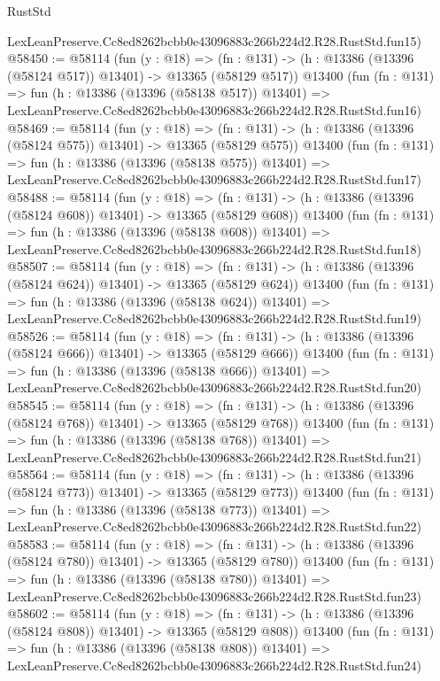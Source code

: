 \begin{lexlean}{RustStd}
\begin{coremodule}
    LexLeanPreserve.Cc8ed8262bcbb0e43096883c266b224d2.R28.RustStd.fun15)
@58450 := @58114
    (fun (y : @18) =>
    (fn : @131) -> (h : @13386 (@13396 (@58124 @517)) @13401) -> @13365 (@58129 @517))
    @13400
    (fun (fn : @131) =>
    fun (h : @13386 (@13396 (@58138 @517)) @13401) =>
    LexLeanPreserve.Cc8ed8262bcbb0e43096883c266b224d2.R28.RustStd.fun16)
@58469 := @58114
    (fun (y : @18) =>
    (fn : @131) -> (h : @13386 (@13396 (@58124 @575)) @13401) -> @13365 (@58129 @575))
    @13400
    (fun (fn : @131) =>
    fun (h : @13386 (@13396 (@58138 @575)) @13401) =>
    LexLeanPreserve.Cc8ed8262bcbb0e43096883c266b224d2.R28.RustStd.fun17)
@58488 := @58114
    (fun (y : @18) =>
    (fn : @131) -> (h : @13386 (@13396 (@58124 @608)) @13401) -> @13365 (@58129 @608))
    @13400
    (fun (fn : @131) =>
    fun (h : @13386 (@13396 (@58138 @608)) @13401) =>
    LexLeanPreserve.Cc8ed8262bcbb0e43096883c266b224d2.R28.RustStd.fun18)
@58507 := @58114
    (fun (y : @18) =>
    (fn : @131) -> (h : @13386 (@13396 (@58124 @624)) @13401) -> @13365 (@58129 @624))
    @13400
    (fun (fn : @131) =>
    fun (h : @13386 (@13396 (@58138 @624)) @13401) =>
    LexLeanPreserve.Cc8ed8262bcbb0e43096883c266b224d2.R28.RustStd.fun19)
@58526 := @58114
    (fun (y : @18) =>
    (fn : @131) -> (h : @13386 (@13396 (@58124 @666)) @13401) -> @13365 (@58129 @666))
    @13400
    (fun (fn : @131) =>
    fun (h : @13386 (@13396 (@58138 @666)) @13401) =>
    LexLeanPreserve.Cc8ed8262bcbb0e43096883c266b224d2.R28.RustStd.fun20)
@58545 := @58114
    (fun (y : @18) =>
    (fn : @131) -> (h : @13386 (@13396 (@58124 @768)) @13401) -> @13365 (@58129 @768))
    @13400
    (fun (fn : @131) =>
    fun (h : @13386 (@13396 (@58138 @768)) @13401) =>
    LexLeanPreserve.Cc8ed8262bcbb0e43096883c266b224d2.R28.RustStd.fun21)
@58564 := @58114
    (fun (y : @18) =>
    (fn : @131) -> (h : @13386 (@13396 (@58124 @773)) @13401) -> @13365 (@58129 @773))
    @13400
    (fun (fn : @131) =>
    fun (h : @13386 (@13396 (@58138 @773)) @13401) =>
    LexLeanPreserve.Cc8ed8262bcbb0e43096883c266b224d2.R28.RustStd.fun22)
@58583 := @58114
    (fun (y : @18) =>
    (fn : @131) -> (h : @13386 (@13396 (@58124 @780)) @13401) -> @13365 (@58129 @780))
    @13400
    (fun (fn : @131) =>
    fun (h : @13386 (@13396 (@58138 @780)) @13401) =>
    LexLeanPreserve.Cc8ed8262bcbb0e43096883c266b224d2.R28.RustStd.fun23)
@58602 := @58114
    (fun (y : @18) =>
    (fn : @131) -> (h : @13386 (@13396 (@58124 @808)) @13401) -> @13365 (@58129 @808))
    @13400
    (fun (fn : @131) =>
    fun (h : @13386 (@13396 (@58138 @808)) @13401) =>
    LexLeanPreserve.Cc8ed8262bcbb0e43096883c266b224d2.R28.RustStd.fun24)

\end{coremodule}
\end{lexlean}
